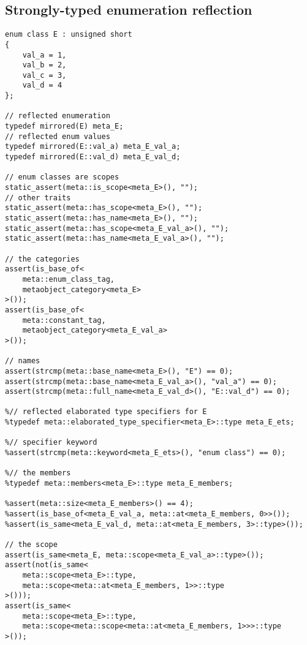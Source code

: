 \subsection{Strongly-typed enumeration reflection}

\begin{verbatim}
enum class E : unsigned short
{
	val_a = 1,
	val_b = 2,
	val_c = 3,
	val_d = 4
};

// reflected enumeration
typedef mirrored(E) meta_E;
// reflected enum values
typedef mirrored(E::val_a) meta_E_val_a;
typedef mirrored(E::val_d) meta_E_val_d;

// enum classes are scopes
static_assert(meta::is_scope<meta_E>(), "");
// other traits
static_assert(meta::has_scope<meta_E>(), "");
static_assert(meta::has_name<meta_E>(), "");
static_assert(meta::has_scope<meta_E_val_a>(), "");
static_assert(meta::has_name<meta_E_val_a>(), "");

// the categories
assert(is_base_of<
	meta::enum_class_tag,
	metaobject_category<meta_E>
>());
assert(is_base_of<
	meta::constant_tag,
	metaobject_category<meta_E_val_a>
>());

// names
assert(strcmp(meta::base_name<meta_E>(), "E") == 0);
assert(strcmp(meta::base_name<meta_E_val_a>(), "val_a") == 0);
assert(strcmp(meta::full_name<meta_E_val_d>(), "E::val_d") == 0);

%// reflected elaborated type specifiers for E
%typedef meta::elaborated_type_specifier<meta_E>::type meta_E_ets;

%// specifier keyword
%assert(strcmp(meta::keyword<meta_E_ets>(), "enum class") == 0);

%// the members
%typedef meta::members<meta_E>::type meta_E_members;

%assert(meta::size<meta_E_members>() == 4);
%assert(is_base_of<meta_E_val_a, meta::at<meta_E_members, 0>>());
%assert(is_same<meta_E_val_d, meta::at<meta_E_members, 3>::type>());

// the scope
assert(is_same<meta_E, meta::scope<meta_E_val_a>::type>());
assert(not(is_same<
	meta::scope<meta_E>::type,
	meta::scope<meta::at<meta_E_members, 1>>::type
>()));
assert(is_same<
	meta::scope<meta_E>::type,
	meta::scope<meta::scope<meta::at<meta_E_members, 1>>>::type
>());

\end{verbatim}
